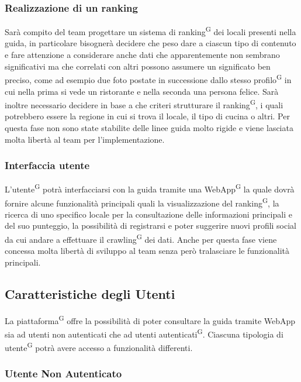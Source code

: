 \subsubsection{Realizzazione di un ranking}
Sarà compito del team progettare un sistema di ranking\textsuperscript{G} dei locali presenti nella guida, in particolare bisognerà decidere che peso dare a ciascun tipo di contenuto e fare attenzione a considerare anche dati che apparentemente non sembrano significativi ma che correlati con altri possono assumere un significato ben preciso, come ad esempio due foto postate in successione dallo stesso profilo\textsuperscript{G} in cui nella prima si vede un ristorante e nella seconda una persona felice. Sarà inoltre necessario decidere in base a che criteri strutturare il ranking\textsuperscript{G}, i quali potrebbero essere la regione in cui si trova il locale, il tipo di cucina o altri. Per questa fase non sono state stabilite delle linee guida molto rigide e viene lasciata molta libertà al team per l’implementazione.

\subsubsection{Interfaccia utente}
L’utente\textsuperscript{G} potrà interfacciarsi con la guida tramite una WebApp\textsuperscript{G} la quale dovrà fornire alcune funzionalità principali quali la visualizzazione del ranking\textsuperscript{G}, la ricerca di uno specifico locale per la consultazione delle informazioni principali e del suo punteggio, la possibilità di registrarsi e poter suggerire nuovi profili social da cui andare a effettuare il crawling\textsuperscript{G} dei dati.
Anche per questa fase viene concessa molta libertà di sviluppo al team senza però tralasciare le funzionalità principali.

\subsection{Caratteristiche degli Utenti}

La piattaforma\textsuperscript{G} offre la possibilità di poter consultare la guida tramite WebApp sia ad utenti non autenticati che ad utenti autenticati\textsuperscript{G}. Ciascuna tipologia di utente\textsuperscript{G} potrà avere accesso a funzionalità differenti.

\subsubsection{Utente Non Autenticato}

